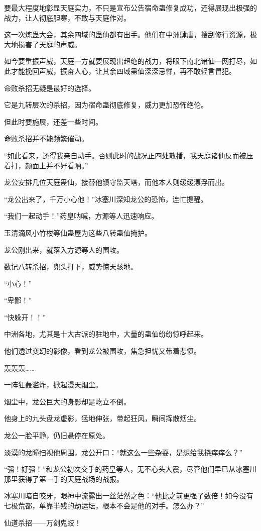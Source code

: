 \begin{this_body}
要最大程度地彰显天庭实力，不只是宣布公告宿命蛊修复成功，还得展现出极强的战力，让人彻底胆寒，不敢与天庭作对。

这一次炼蛊大会，其余四域的蛊仙都有出手。他们在中洲肆虐，搜刮修行资源，极大地损害了天庭的声威。

如今要重振声威，天庭一方就要展现出超绝的战力，将眼下南北诸仙一网打尽，如此才能挽回声威，振奋人心，让其余四域蛊仙深深忌惮，再不敢轻言冒犯。

命败杀招无疑是最好的选择。

它是九转层次的杀招，因为宿命蛊彻底修复，威力更加恐怖绝伦。

但此时要施展，还差一些时间。

命败杀招并不能频繁催动。

“如此看来，还得我亲自动手。否则此时的战况正四处散播，我天庭诸仙反而被压着打，颜面上并不好看呐。”

龙公安排几位天庭蛊仙，接替他镇守监天塔，而他本人则缓缓漂浮而出。

“龙公出来了，千万小心他！”冰塞川深知龙公的恐怖，连忙提醒。

“我们一起动手！”药皇呐喊，方源等人迅速响应。

玉清滴风小竹楼等仙蛊屋为这些八转蛊仙掩护。

龙公刚出来，就落入方源等人的围攻。

数记八转杀招，兜头打下，威势惊天骇地。

“小心！”

“卑鄙！”

“快躲开！！”

中洲各地，尤其是十大古派的驻地中，大量的蛊仙纷纷惊呼起来。

他们透过变幻的影像，看到龙公被围攻，焦急担忧又带着悲愤。

轰轰轰……

一阵狂轰滥炸，掀起漫天烟尘。

烟尘中，龙公巨大的身影却是屹立不倒。

他身上的九头盘龙虚影，猛地伸张，带起狂风，瞬间挥散烟尘。

龙公一脸平静，仍旧悬停在原处。

淡漠的龙瞳扫视他周围，龙公开口：“就这么一些杂耍，是想给我挠痒痒么？”

“强！好强！”和龙公初次交手的药皇等人，无不心头大震，尽管他们早已从冰塞川那里获得了第一手的天庭战场的战报。

冰塞川暗自咬牙，眼神中流露出一丝茫然之色：“他比之前更强了数倍！如今没有七极荒都，单靠半残的劫运坛，根本不会是他的对手。怎么办？”

仙道杀招——万剑鬼蛟！


\end{this_body}

